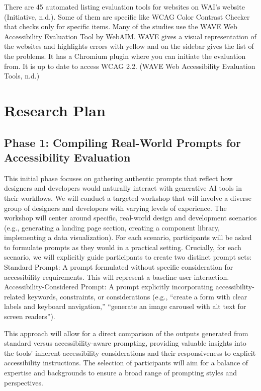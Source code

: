 \documentclass{article}
\begin{document}
There are 45 automated listing  evaluation tools for websites on WAI’s website (Initiative, n.d.). Some of them are specific like WCAG Color Contrast Checker that checks only for specific items. Many of the studies use the WAVE Web Accessibility Evaluation Tool by WebAIM. WAVE gives a visual representation of the websites and highlights errors with yellow and on the sidebar gives the list of the problems. It has a Chromium plugin where you can initiate the evaluation from.  It is up to date to access WCAG 2.2. (WAVE Web Accessibility Evaluation Tools, n.d.)

\section{Research Plan}

\subsection{Phase 1: Compiling Real-World Prompts for Accessibility Evaluation}

This initial phase focuses on gathering authentic prompts that reflect how designers and developers would naturally interact with generative AI tools in their workflows. We will conduct a targeted workshop that will involve a diverse group of designers and developers with varying levels of experience. The workshop will center around specific, real-world design and development scenarios (e.g., generating a landing page section, creating a component library, implementing a data visualization). For each scenario, participants will be asked to formulate prompts as they would in a practical setting. Crucially, for each scenario, we will explicitly guide participants to create two distinct prompt sets:
Standard Prompt: A prompt formulated without specific consideration for accessibility requirements. This will represent a baseline user interaction.
Accessibility-Considered Prompt: A prompt explicitly incorporating accessibility-related keywords, constraints, or considerations (e.g., ``create a form with clear labels and keyboard navigation,'' ``generate an image carousel with alt text for screen readers'').

This approach will allow for a direct comparison of the outputs generated from standard versus accessibility-aware prompting, providing valuable insights into the tools' inherent accessibility considerations and their responsiveness to explicit accessibility instructions. The selection of participants will aim for a balance of expertise and backgrounds to ensure a broad range of prompting styles and perspectives.
\end{document}
